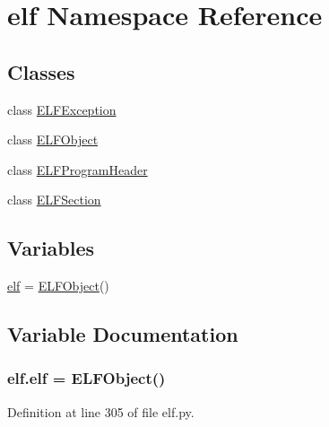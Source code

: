 \hypertarget{namespaceelf}{}\section{elf Namespace Reference}
\label{namespaceelf}
\subsection*{Classes}
\begin{DoxyCompactItemize}
\item 
class \hyperlink{clasself_1_1_e_l_f_exception}{E\+L\+F\+Exception}
\item 
class \hyperlink{clasself_1_1_e_l_f_object}{E\+L\+F\+Object}
\item 
class \hyperlink{clasself_1_1_e_l_f_program_header}{E\+L\+F\+Program\+Header}
\item 
class \hyperlink{clasself_1_1_e_l_f_section}{E\+L\+F\+Section}
\end{DoxyCompactItemize}
\subsection*{Variables}
\begin{DoxyCompactItemize}
\item 
\hyperlink{namespaceelf_a087d0044f25cbac7806c563e24b52263}{elf} = \hyperlink{clasself_1_1_e_l_f_object}{E\+L\+F\+Object}()
\end{DoxyCompactItemize}


\subsection{Variable Documentation}
\subsubsection[{\texorpdfstring{elf}{elf}}]{\setlength{\rightskip}{0pt plus 5cm}elf.\+elf = {\bf E\+L\+F\+Object}()}\hypertarget{namespaceelf_a087d0044f25cbac7806c563e24b52263}{}\label{namespaceelf_a087d0044f25cbac7806c563e24b52263}


Definition at line 305 of file elf.\+py.

